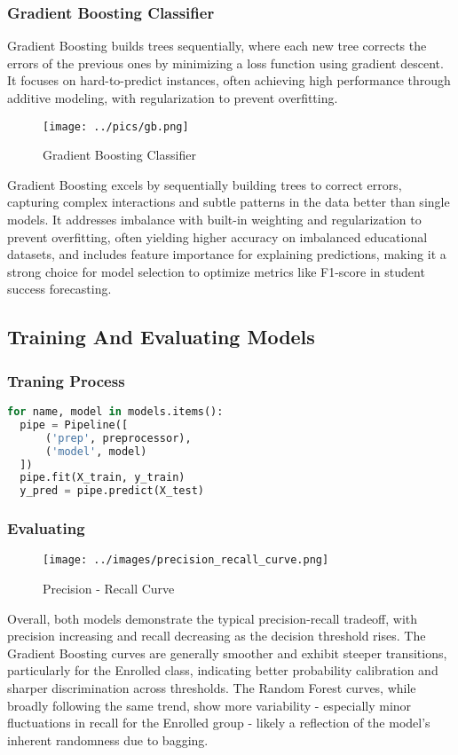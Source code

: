 \documentclass[twoside,final]{hcmut-report}
\begin{document}
\subsubsection*{Gradient Boosting Classifier}
Gradient Boosting builds trees sequentially, where each new tree corrects the errors of the previous ones by minimizing a loss function using gradient descent. It focuses on hard-to-predict instances, often achieving high performance through additive modeling, with regularization to prevent overfitting.
\begin{figure}[H]
  \centering
  \texttt{[image: ../pics/gb.png]}
  \caption{Gradient Boosting Classifier}
  \label{gb_clf}
\end{figure}
Gradient Boosting excels by sequentially building trees to correct errors, capturing complex interactions and subtle patterns in the data better than single models. It addresses imbalance with built-in weighting and regularization to prevent overfitting, often yielding higher accuracy on imbalanced educational datasets, and includes feature importance for explaining predictions, making it a strong choice for model selection to optimize metrics like F1-score in student success forecasting.
\subsection{Training And Evaluating Models}
\subsubsection*{Traning Process}
\begin{lstlisting}[language=python]
for name, model in models.items():
  pipe = Pipeline([
      ('prep', preprocessor),
      ('model', model)
  ])
  pipe.fit(X_train, y_train)
  y_pred = pipe.predict(X_test)
\end{lstlisting}
\subsubsection*{Evaluating}
\begin{figure}[H]
  \centering
  \texttt{[image: ../images/precision\_recall\_curve.png]}
  \caption{Precision - Recall Curve}
  \label{pr_curve}
\end{figure}
Overall, both models demonstrate the typical precision-recall tradeoff, with precision increasing and recall decreasing as the decision threshold rises. The Gradient Boosting curves are generally smoother and exhibit steeper transitions, particularly for the Enrolled class, indicating better probability calibration and sharper discrimination across thresholds. The Random Forest curves, while broadly following the same trend, show more variability - especially minor fluctuations in recall for the Enrolled group - likely a reflection of the model's inherent randomness due to bagging.\\
\end{document}
